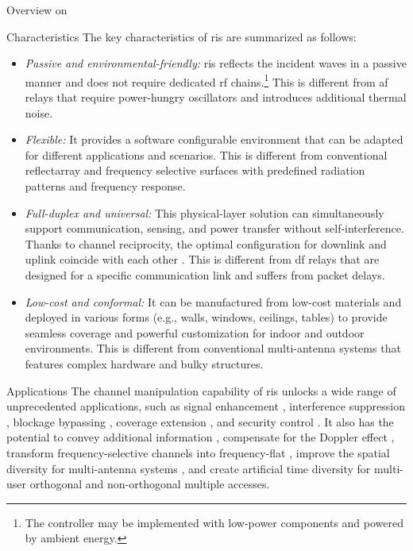 \begin{section}{Overview on }
	\begin{subsection}{Characteristics}
		The key characteristics of \gls{ris} are summarized as follows:
		\begin{itemize}
			\item \emph{Passive and environmental-friendly:} \gls{ris} reflects the incident waves in a passive manner and does not require dedicated \gls{rf} chains.\footnote{The controller may be implemented with low-power components and powered by ambient energy.} This is different from \gls{af} relays that require power-hungry oscillators and introduces additional thermal noise.
			\item \emph{Flexible:} It provides a software configurable environment that can be adapted for different applications and scenarios. This is different from conventional reflectarray \cite{Nayeri2018} and frequency selective surfaces \cite{Anwar2018} with predefined radiation patterns and frequency response.
			\item \emph{Full-duplex and universal:} This physical-layer solution can simultaneously support communication, sensing, and power transfer without self-interference. Thanks to channel reciprocity, the optimal configuration for downlink and uplink coincide with each other \cite{Wu2021}. This is different from \gls{df} relays that are designed for a specific communication link and suffers from packet delays.
			\item \emph{Low-cost and conformal:} It can be manufactured from low-cost materials and deployed in various forms (e.g., walls, windows, ceilings, tables) to provide seamless coverage and powerful customization for indoor and outdoor environments. This is different from conventional multi-antenna systems that features complex hardware and bulky structures.
		\end{itemize}
	\end{subsection}

	\begin{subsection}{Applications}
		The channel manipulation capability of \gls{ris} unlocks a wide range of unprecedented applications, such as signal enhancement \cite{Wu2019}, interference suppression \cite{Jiang2022}, blockage bypassing \cite{Ghatak2021}, coverage extension \cite{Zeng2021}, and security control \cite{Almohamad2020}.
		It also has the potential to convey additional information \cite{Ye2022}, compensate for the Doppler effect \cite{Basar2021}, transform frequency-selective channels into frequency-flat \cite{Arslan2022}, improve the spatial diversity for multi-antenna systems \cite{Ozdogan2020a}, and create artificial time diversity for multi-user orthogonal \cite{Yang2019} and non-orthogonal \cite{Chen2023} multiple accesses.


\end{subsection}
\end{section}
